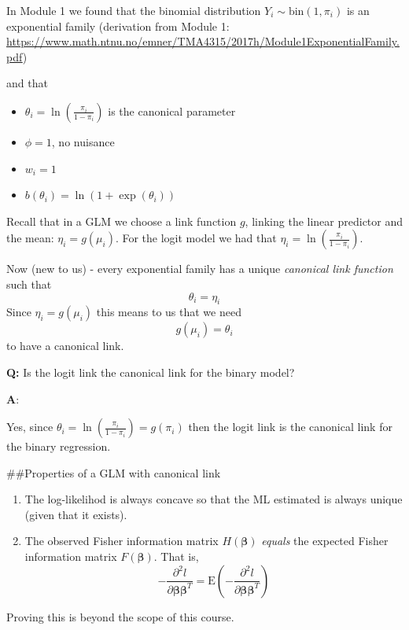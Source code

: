 \documentclass[
  ignorenonframetext,
]{beamer}
\providecommand{\tightlist}{%
  \setlength{\itemsep}{0pt}\setlength{\parskip}{0pt}}
\begin{document}
\begin{frame}
In Module 1 we found that the binomial distribution
\(Y_i\sim \text{bin}(1,\pi_i)\) is an exponential family (derivation
from Module 1:
\url{https://www.math.ntnu.no/emner/TMA4315/2017h/Module1ExponentialFamily.pdf})

and that

\begin{itemize}
\tightlist
\item
  \(\theta_i=\ln( \frac{\pi_i}{1-\pi_i})\) is the canonical parameter
\item
  \(\phi=1\), no nuisance
\item
  \(w_i=1\)
\item
  \(b(\theta_i)=\ln(1+\exp(\theta_i))\)
\end{itemize}
\end{frame}

\begin{frame}
Recall that in a GLM we choose a link function \(g\), linking the linear
predictor and the mean: \(\eta_i=g(\mu_i)\). For the logit model we had
that \(\eta_i=\ln(\frac{\pi_i}{1-\pi_i})\).

Now (new to us) - every exponential family has a unique \emph{canonical
link function} such that \[\theta_i=\eta_i\] Since \(\eta_i=g(\mu_i)\)
this means to us that we need \[ g(\mu_i)=\theta_i\] to have a canonical
link.

\textbf{Q:} Is the logit link the canonical link for the binary model?

\textbf{A}:

Yes, since \(\theta_i=\ln( \frac{\pi_i}{1-\pi_i})=g(\pi_i)\) then the
logit link is the canonical link for the binary regression.
\end{frame}

\begin{frame}
\#\#Properties of a GLM with canonical link

\begin{enumerate}
\item
  The log-likelihod is always concave so that the ML estimated is always
  unique (given that it exists).
\item
  The observed Fisher information matrix \(H(\boldsymbol{\beta})\)
  \emph{equals} the expected Fisher information matrix
  \(F(\boldsymbol{\beta})\). That is,
  \[-\frac{\partial^2 l}{\partial \boldsymbol{\beta} \boldsymbol{\beta}^T}=\text{E}(-\frac{\partial^2 l}{\partial \boldsymbol{\beta} \boldsymbol{\beta}^T})\]
\end{enumerate}

Proving this is beyond the scope of this course.
\end{frame}
\end{document}
